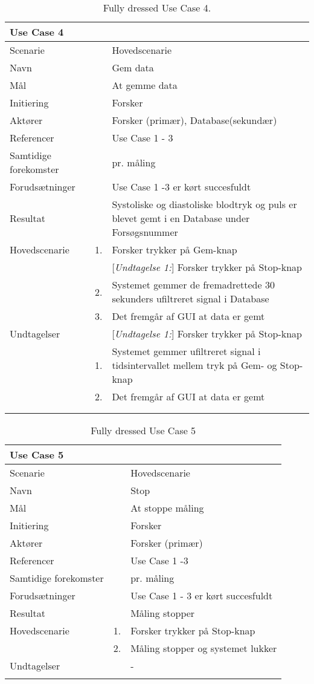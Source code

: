 \begin{longtabu} to  %
    {\large \textbf{Use Case 4}} && \\
    \toprule
    Scenarie && Hovedscenarie\\
    Navn && Gem data\\
    Mål && At gemme data\\
    Initiering && Forsker\\
    Aktører && Forsker (primær), Database(sekundær)\\
    Referencer && Use Case 1 - 3 \\
    Samtidige forekomster  &&  pr. måling\\
    Forudsætninger && Use Case 1  -3 er kørt succesfuldt\\
    Resultat && Systoliske og diastoliske blodtryk og puls er blevet gemt i en Database under Forsøgsnummer\\ \midrule
    Hovedscenarie &    1. &		Forsker trykker på Gem-knap\\[-1ex] 
    &	& [\textit{Undtagelse 1:}] Forsker trykker på Stop-knap\\
                  &    2. &     Systemet gemmer de fremadrettede 30 sekunders ufiltreret signal i Database\\
                    &    3. &   Det fremgår af GUI at data er gemt\\ \midrule	 	
 Undtagelser &    & [\textit{Undtagelse 1:}] Forsker trykker på Stop-knap\\
 & 1. 	& Systemet gemmer ufiltreret signal i tidsintervallet mellem tryk på Gem- og Stop-knap\\  
 & 2. & Det fremgår af GUI at data er gemt\\
 \\ \bottomrule
\caption{Fully dressed Use Case 4.}
\label{UC4}
\end{longtabu}

\begin{longtabu} to  %
	{\large \textbf{Use Case 5}} && \\
	\toprule
	Scenarie && Hovedscenarie\\
	Navn && Stop \\
	Mål && At stoppe måling\\
	Initiering && Forsker\\
	Aktører && Forsker (primær)\\
	Referencer && Use Case 1 -3  \\
	Samtidige forekomster  &&  pr. måling\\
	Forudsætninger && Use Case 1  - 3 er kørt succesfuldt\\
	Resultat && Måling stopper\\ \midrule
	Hovedscenarie &    1. &		Forsker trykker på Stop-knap\\[-1ex] 
	&    2. &   Måling stopper og systemet lukker\\ \midrule	 	
	Undtagelser &    & - 	\\ \bottomrule
	\caption{Fully dressed Use Case 5}
	\label{UC5}
\end{longtabu}

